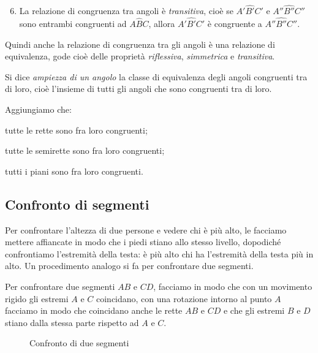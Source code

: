 \begin{enumerate}[label=\Roman{*}.]
\setcounter{enumi}{5}
\item La relazione di congruenza tra angoli è \emph{transitiva}, cioè se $A'\widehat{B'}C'$ e $A''\widehat{B''}C''$ sono entrambi congruenti ad $A\widehat{B}C$, allora $A'\widehat{B'}C'$ è congruente a $A''\widehat{B''}C''$.
\end{enumerate}

Quindi anche la relazione di congruenza tra gli angoli è una relazione di equivalenza, gode cioè delle proprietà \emph{riflessiva}, \emph{simmetrica} e \emph{transitiva}.

\begin{definizione}
Si dice \emph{ampiezza di un angolo} la classe di equivalenza degli angoli congruenti tra di loro, cioè l'insieme di tutti gli angoli che sono congruenti tra di loro.
\end{definizione}

Aggiungiamo che:
\begin{itemize*}
\item tutte le rette sono fra loro congruenti;
\item tutte le semirette sono fra loro congruenti;
\item tutti i piani sono fra loro congruenti.
\end{itemize*}

\subsection{Confronto di segmenti}

Per confrontare l'altezza di due persone e vedere chi è più alto, le facciamo mettere affiancate in modo che i piedi stiano allo stesso livello, dopodiché confrontiamo l'estremità della testa: è più alto chi ha l'estremità della testa più in alto. Un procedimento analogo si fa per confrontare due segmenti.

Per confrontare due segmenti $AB$ e $CD$, facciamo in modo che con un movimento rigido gli estremi $A$ e $C$ coincidano, con una rotazione intorno al punto $A$ facciamo in  modo che coincidano anche le rette $AB$ e $CD$ e che gli estremi $B$ e $D$ stiano dalla stessa parte rispetto ad $A$ e $C$.

\begin{figure}[htb]
\centering
\caption{Confronto di due segmenti}
\end{figure}

